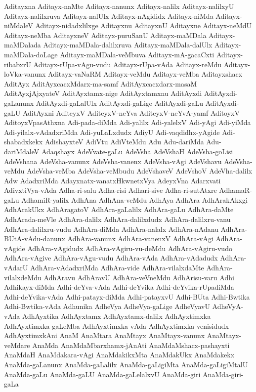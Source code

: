 {Aditayxna
Aditayx-naMte
Aditayx-nanunx
Aditayx-nalilx
Aditayx-nalilxyU
Aditayx-nalilxruva
Aditayx-nalUlx
Aditayx-nAgididx
Aditayx-niMda
Aditayx-niMdaleV
Aditayx-nidadxlilxge
Aditayxnu
AditayxnU
Aditayxne
Aditayx-neMdU
Aditayx-neMba
AditayxneV
Aditayx-puruSanU
Aditayx-maMDala
Aditayx-maMDalada
Aditayx-maMDala-dalilxruva
Aditayx-maMDala-dalUlx
Aditayx-maMDala-doLage
Aditayx-maMDala-veMbuva
Aditayx-mA-gacaCxti
Aditayx-ribabxrU
Aditayx-rUpa-vAgu-vudu
Aditayx-rUpa-vAda
Aditayx-reMdu
Aditayx-loVka-vanunx
Aditayx-vaNaRM
Aditayx-veMdu
Aditayx-veMba
Aditayxshacx
AditAyx
AditAyxcacxMdarx-ma-samf
AditAyxcacxdarx-masaM
AditAyxjAjxyateV
AditAyxtamx-nige
AditAyxtamxnu
AditAyxdi
AditAyxdi-gaLanunx
AditAyxdi-gaLalUlx
AditAyxdi-gaLige
AditAyxdi-gaLu
AditAyxdi-gaLU
AditAyxni
AditeyxV
AditeyxV-neYva
AditeyxV-neYvA-yamf
AditoyxV
AditoyxVpasAthxna
Adi-pada-diMda
Adi-yalilx
Adi-yalelxV
Adi-yAgi
Adi-yiMda
Adi-yilalx-vAdadxriMda
Adi-yuLaLxdudx
AdiyU
Adi-vaqdidhx-yAgide
Adi-shabadxkekx
AdishayxteV
AdiVtu
AdiVteMdu
Adu
Adu-dariMda
Adu-dariMdaleV
Adaqshayx
AdeVvate-gaLu
AdeVsha
AdeVshaH
AdeVsha-goLisi
AdeVshana
AdeVsha-vanunx
AdeVsha-vanenx
AdeVsha-vAgi
AdeVshavu
AdeVsha-veMdu
AdeVsha-veMba
AdeVsha-veMbudu
AdeVshaveV
AdeVshoV
AdeVha-dalilx
Adw
AdadxriMda
Adayxnatx-vanatxHkwnetxVya
AdeyxVna
Adarxvati
AdivxtiVya-vAda
Adha-ri-salu
Adha-risi
Adhari-sive
Adha-ri-sutAtxre
AdhamaR-gaLu
AdhamiR-yalilx
AdhAna
AdhAna-veMdu
AdhAya
AdhAra
AdhArakAkxgi
AdhArakUkx
AdhAragatoV
AdhAra-gaLalilx
AdhAra-gaLu
AdhAra-daMte
AdhArada-meVle
AdhAra-dalilx
AdhAra-dalilxdudx
AdhAra-dalilxru-vanu
AdhAra-dalilxru-vudu
AdhAra-diMda
AdhAra-nalalx
AdhAra-nAdanu
AdhAra-BUtA-vAdu-danunx
AdhAra-vanunx
AdhAra-vanenxV
AdhAra-vAgi
AdhAra-vAgide
AdhAra-vAgidudx
AdhAra-vAgiru-vu-deMdu
AdhAra-vAgiru-vudo
AdhAra-vAgive
AdhAra-vAgu-vudu
AdhAra-vAda
AdhAra-vAdadudx
AdhAra-vAdarU
AdhAra-vAdadxriMda
AdhAra-vide
AdhAra-vilalxdaMte
AdhAra-vilalxdeMdu
AdhAravu
AdhAravU
AdhAra-veVneMdu
AdhArisu-varu
Adhi
Adhikayx-diMda
Adhi-deYva-vAda
Adhi-deYvika
Adhi-deYvika-rUpadiMda
Adhi-deYvika-vAda
Adhi-patayx-diMda
Adhi-patayxvU
Adhi-BUta
Adhi-Bwtika
Adhi-Bwtika-vAda
Adhunika
AdheVya
AdheVya-gaLige
AdheVyavU
AdheVyA-vAda
AdhAyxtika
AdhAyxtamx
AdhAyxtamx-dalilx
AdhAyxtimxka
AdhAyxtimxka-gaLeMba
AdhAyxtimxka-vAda
AdhAyxtimxka-venisidudx
AdhAyxtimxkAni
AnaM
AnaMtara
AnaMtayx
AnaMtayx-vanunx
AnaMtayx-veMdare
AnaMda
AnaMdaMbarxhamx-jAnAti
AnaMdaMshacx-pashayxti
AnaMdaH
AnaMdakara-vAgi
AnaMdakikxMta
AnaMdakUkx
AnaMdakekx
AnaMda-gaLanunx
AnaMda-gaLalilx
AnaMda-gaLigiMta
AnaMda-gaLigiMtalU
AnaMda-gaLu
AnaMda-gaLU
AnaMda-gaLelalxvU
AnaMda-giri
AnaMda-giri-gaLa
}
